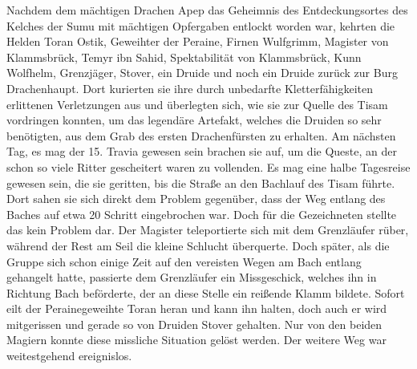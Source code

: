 Nachdem dem mächtigen Drachen Apep das Geheimnis des Entdeckungsortes des Kelches der Sumu mit mächtigen Opfergaben entlockt worden war, kehrten die Helden Toran Ostik, Geweihter der Peraine, Firnen Wulfgrimm, Magister von Klammsbrück, Temyr ibn Sahid, Spektabilität von Klammsbrück, Kunn Wolfhelm, Grenzjäger, Stover, ein Druide und noch ein Druide zurück zur Burg Drachenhaupt. Dort kurierten sie ihre durch unbedarfte Kletterfähigkeiten erlittenen Verletzungen aus und überlegten sich, wie sie zur Quelle des Tisam vordringen konnten, um das legendäre Artefakt, welches die Druiden so sehr benötigten, aus dem Grab des ersten Drachenfürsten zu erhalten.
Am nächsten Tag, es mag der 15. Travia gewesen sein brachen sie auf, um die Queste, an der schon so viele Ritter gescheitert waren zu vollenden. Es mag eine halbe Tagesreise gewesen sein, die sie geritten, bis die Straße an den Bachlauf des Tisam führte. Dort sahen sie sich direkt dem Problem gegenüber, dass der Weg entlang des Baches auf etwa 20 Schritt eingebrochen war. Doch für die Gezeichneten stellte das kein Problem dar. Der Magister teleportierte sich mit dem Grenzläufer rüber, während der Rest am Seil die kleine Schlucht überquerte. Doch später, als die Gruppe sich schon einige Zeit auf den vereisten Wegen am Bach entlang gehangelt hatte, passierte dem Grenzläufer ein Missgeschick, welches ihn in Richtung Bach beförderte, der an diese Stelle ein reißende Klamm bildete. Sofort eilt der Perainegeweihte Toran heran und kann ihn halten, doch auch er wird mitgerissen und gerade so von Druiden Stover gehalten. Nur von den beiden Magiern konnte diese missliche Situation gelöst werden. Der weitere Weg war weitestgehend ereignislos.

